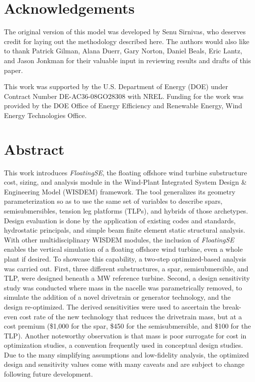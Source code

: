 \chapter*{Acknowledgements}
The original version of this model was developed by Senu Sirnivas, who
deserves credit for laying out the methodology described here.  The
authors would also like to thank Patrick Gilman, Alana Duerr, Gary
Norton, Daniel Beals, Eric Lantz, and Jason Jonkman for their valuable
input in reviewing results and drafts of this paper.

This work was supported by the U.S. Department of Energy (DOE) under
Contract Number DE-AC36-08GO28308 with NREL. Funding for the work was
provided by the DOE Office of Energy Efficiency and Renewable Energy,
Wind Energy Technologies Office.

\chapter*{Abstract}
This work introduces \textit{FloatingSE}, the floating offshore wind
turbine substructure cost, sizing, and analysis module in the Wind-Plant
Integrated System Design \& Engineering Model (WISDEM) framework.  The
tool generalizes its geometry parameterization so as to use the same set
of variables to describe spars, semisubmersibles, tension leg platforms
(TLPs), and hybrids of those archetypes.  Design evaluation is done by
the application of existing codes and standards, hydrostatic principals,
and simple beam finite element static structural analysis.  With other
multidisciplinary WISDEM modules, the inclusion of \textit{FloatingSE}
enables the vertical simulation of a floating offshore wind turbine,
even a whole plant if desired.  To showcase this capability, a two-step
optimized-based analysis was carried out.  First, three different
substructures, a spar, semisubmersible, and TLP, were designed beneath a
\unit[10]{MW} reference turbine. Second, a design sensitivity study was
conducted where mass in the nacelle was parametrically removed, to
simulate the addition of a novel drivetrain or generator technology, and
the design re-optimized.  The derived sensitivities were used to
ascertain the break-even cost rate of the new technology that reduces
the drivetrain mass, but at a cost premium (\$1,000 for the spar, \$450
for the semisubmersible, and \$100 for the TLP).  Another noteworthy
observation is that mass is poor surrogate for cost in optimization
studies, a convention frequently used in conceptual design studies.  Due
to the many simplifying assumptions and low-fidelity analysis, the
optimized design and sensitivity values come with many caveats and are
subject to change following future development.
